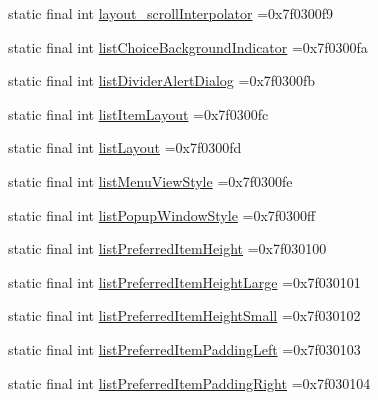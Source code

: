 \begin{DoxyCompactItemize}
\item 
static final int \mbox{\hyperlink{classbr_1_1unb_1_1cic_1_1mp_1_1marketmaster_1_1R_1_1attr_a363309f45ccbe1bf76d1d1b387c66829}{layout\+\_\+scroll\+Interpolator}} =0x7f0300f9
\item 
static final int \mbox{\hyperlink{classbr_1_1unb_1_1cic_1_1mp_1_1marketmaster_1_1R_1_1attr_a9156f8a37a20ef6372e0d15409ad50ec}{list\+Choice\+Background\+Indicator}} =0x7f0300fa
\item 
static final int \mbox{\hyperlink{classbr_1_1unb_1_1cic_1_1mp_1_1marketmaster_1_1R_1_1attr_af9a6e4ccf68d03b1643aeb255e7ae85c}{list\+Divider\+Alert\+Dialog}} =0x7f0300fb
\item 
static final int \mbox{\hyperlink{classbr_1_1unb_1_1cic_1_1mp_1_1marketmaster_1_1R_1_1attr_af9dcdd96e53e5b237d71ec4095ca203f}{list\+Item\+Layout}} =0x7f0300fc
\item 
static final int \mbox{\hyperlink{classbr_1_1unb_1_1cic_1_1mp_1_1marketmaster_1_1R_1_1attr_a877b152113c9c843df3413acebef56e7}{list\+Layout}} =0x7f0300fd
\item 
static final int \mbox{\hyperlink{classbr_1_1unb_1_1cic_1_1mp_1_1marketmaster_1_1R_1_1attr_a357cb87d25d864def0c2b90c06a56b76}{list\+Menu\+View\+Style}} =0x7f0300fe
\item 
static final int \mbox{\hyperlink{classbr_1_1unb_1_1cic_1_1mp_1_1marketmaster_1_1R_1_1attr_a732cdc9205ea553e91412bb0eab8e26d}{list\+Popup\+Window\+Style}} =0x7f0300ff
\item 
static final int \mbox{\hyperlink{classbr_1_1unb_1_1cic_1_1mp_1_1marketmaster_1_1R_1_1attr_a09ff6aadd822b80e15ee20a662472ddd}{list\+Preferred\+Item\+Height}} =0x7f030100
\item 
static final int \mbox{\hyperlink{classbr_1_1unb_1_1cic_1_1mp_1_1marketmaster_1_1R_1_1attr_a67eadc33b64b51960226da682555cab8}{list\+Preferred\+Item\+Height\+Large}} =0x7f030101
\item 
static final int \mbox{\hyperlink{classbr_1_1unb_1_1cic_1_1mp_1_1marketmaster_1_1R_1_1attr_a9cd35c2a1ac15d4c207da8210e54e580}{list\+Preferred\+Item\+Height\+Small}} =0x7f030102
\item 
static final int \mbox{\hyperlink{classbr_1_1unb_1_1cic_1_1mp_1_1marketmaster_1_1R_1_1attr_ab333c18bb4a1ae4a4db10af4891ec841}{list\+Preferred\+Item\+Padding\+Left}} =0x7f030103
\item 
static final int \mbox{\hyperlink{classbr_1_1unb_1_1cic_1_1mp_1_1marketmaster_1_1R_1_1attr_aa698dfec575190043af2a7f45ff08be9}{list\+Preferred\+Item\+Padding\+Right}} =0x7f030104

\end{DoxyCompactItemize}
